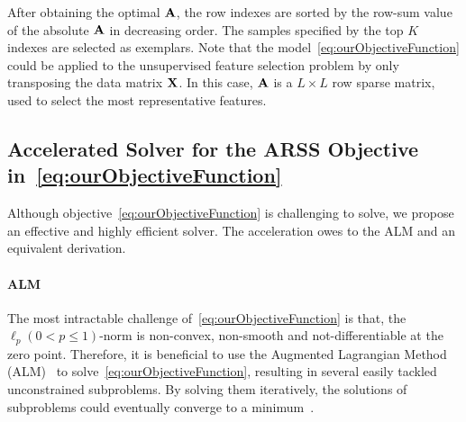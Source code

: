 \documentclass[a4paper]{article}
\begin{document}
After obtaining the optimal $\mathbf{A}$, the row indexes are sorted
by the row-sum value of the absolute $\mathbf{A}$ in decreasing order.
The samples specified by the top $K$ indexes are selected as exemplars.
Note that the model\ \eqref{eq:ourObjectiveFunction} could be applied
to the unsupervised feature selection problem by only transposing
the data matrix $\mathbf{X}$. In this case, $\mathbf{A}$ is a $L\times L$
row sparse matrix, used to select the most representative features.


\subsection{Accelerated Solver for the ARSS Objective in\ \eqref{eq:ourObjectiveFunction} }

Although objective\ \eqref{eq:ourObjectiveFunction} is challenging
to solve, we propose an effective and highly efficient solver. The
acceleration owes to the ALM and an equivalent derivation.


\paragraph{ALM }

The most intractable challenge of\ \eqref{eq:ourObjectiveFunction}
is that, the $\ell_{p}\left(0<p\leq1\right)$-norm is non-convex,
non-smooth and not-differentiable at the zero point. Therefore, it
is beneficial to use the Augmented Lagrangian Method (ALM)\ \cite{Nocedal_2006_book_numericalOptimization}
to solve\ \eqref{eq:ourObjectiveFunction}, resulting in several
easily tackled unconstrained subproblems. By solving them iteratively,
the solutions of subproblems could eventually converge to a minimum\ \cite{cbLi_2011_PhDthesis_CSfor3D_data,gaofengMeng_2013_ICCV_dehazing}. 
\end{document}

